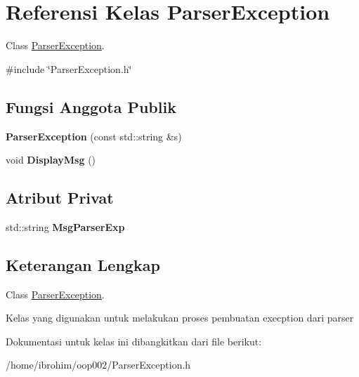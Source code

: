 \hypertarget{classParserException}{}\section{Referensi Kelas Parser\+Exception}
\label{classParserException}


Class \hyperlink{classParserException}{Parser\+Exception}.  




{\ttfamily \#include \char`\"{}Parser\+Exception.\+h\char`\"{}}

\subsection*{Fungsi Anggota Publik}
\begin{DoxyCompactItemize}
\item 
\hypertarget{classParserException_a73e9c79df9bacd24553686e317461a18}{}{\bfseries Parser\+Exception} (const std\+::string \&s)\label{classParserException_a73e9c79df9bacd24553686e317461a18}

\item 
\hypertarget{classParserException_a67db03e39544827abd7a5d94a09818ec}{}void {\bfseries Display\+Msg} ()\label{classParserException_a67db03e39544827abd7a5d94a09818ec}

\end{DoxyCompactItemize}
\subsection*{Atribut Privat}
\begin{DoxyCompactItemize}
\item 
\hypertarget{classParserException_a6dc6dcb4632ea02fa40f6dcb4ff46bbf}{}std\+::string {\bfseries Msg\+Parser\+Exp}\label{classParserException_a6dc6dcb4632ea02fa40f6dcb4ff46bbf}

\end{DoxyCompactItemize}


\subsection{Keterangan Lengkap}
Class \hyperlink{classParserException}{Parser\+Exception}. 

Kelas yang digunakan untuk melakukan proses pembuatan execption dari parser 

Dokumentasi untuk kelas ini dibangkitkan dari file berikut\+:\begin{DoxyCompactItemize}
\item 
/home/ibrohim/oop002/Parser\+Exception.\+h\end{DoxyCompactItemize}
